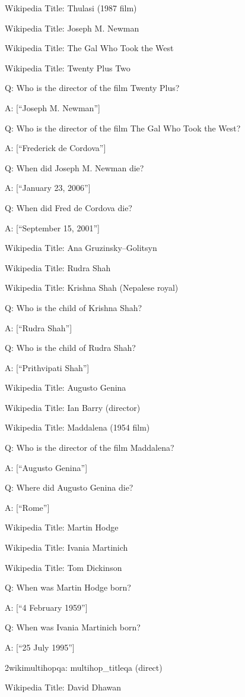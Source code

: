 \documentclass[
]{article}
\begin{document}
Wikipedia Title: Thulasi (1987 film)

Wikipedia Title: Joseph M. Newman

Wikipedia Title: The Gal Who Took the West

Wikipedia Title: Twenty Plus Two

Q: Who is the director of the film Twenty Plus?

A: {[}``Joseph M. Newman''{]}

Q: Who is the director of the film The Gal Who Took the West?

A: {[}``Frederick de Cordova''{]}

Q: When did Joseph M. Newman die?

A: {[}``January 23, 2006''{]}

Q: When did Fred de Cordova die?

A: {[}``September 15, 2001''{]}

Wikipedia Title: Ana Gruzinsky--Golitsyn

Wikipedia Title: Rudra Shah

Wikipedia Title: Krishna Shah (Nepalese royal)

Q: Who is the child of Krishna Shah?

A: {[}``Rudra Shah''{]}

Q: Who is the child of Rudra Shah?

A: {[}``Prithvipati Shah''{]}

Wikipedia Title: Augusto Genina

Wikipedia Title: Ian Barry (director)

Wikipedia Title: Maddalena (1954 film)

Q: Who is the director of the film Maddalena?

A: {[}``Augusto Genina''{]}

Q: Where did Augusto Genina die?

A: {[}``Rome''{]}

Wikipedia Title: Martin Hodge

Wikipedia Title: Ivania Martinich

Wikipedia Title: Tom Dickinson

Q: When was Martin Hodge born?

A: {[}``4 February 1959''{]}

Q: When was Ivania Martinich born?

A: {[}``25 July 1995''{]}

2wikimultihopqa: multihop\_titleqa (direct)

Wikipedia Title: David Dhawan
\end{document}
